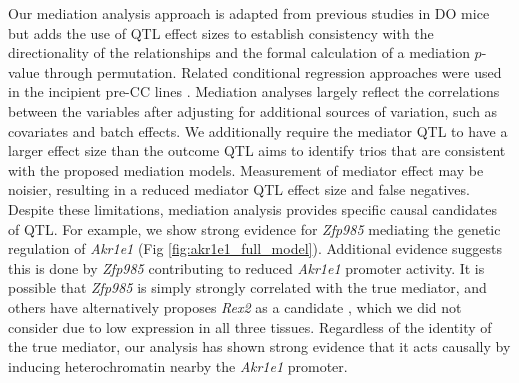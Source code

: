 \documentclass[10pt,letterpaper]{article}
\begin{document}
Our mediation analysis approach is adapted from previous studies in DO mice \cite{Chick2016,Keller2018,Skelly2019} but adds the use of QTL effect sizes to establish consistency with the directionality of the relationships and the formal calculation of a mediation $p$-value through permutation.  Related conditional regression approaches were used in the incipient pre-CC lines \cite{Rutledge2014, Kelada2014}.
Mediation analyses largely reflect the correlations between the variables after adjusting for additional sources of variation, such as covariates and batch effects. We additionally require the mediator QTL to have a larger effect size than the outcome QTL aims to identify trios that are consistent with the proposed mediation models. Measurement of mediator effect may be noisier, resulting in a reduced mediator QTL effect size and false negatives. 
Despite these limitations, mediation analysis provides specific causal candidates of QTL. For example, we show strong evidence for \textit{Zfp985} mediating the genetic regulation of \textit{Akr1e1} (Fig \ref{fig:akr1e1_full_model}). Additional evidence suggests this is done by \textit{Zfp985} contributing to reduced \textit{Akr1e1} promoter activity. It is possible that \textit{Zfp985} is simply strongly correlated with the true mediator, and others have alternatively proposes \textit{Rex2} as a candidate \cite{HamiltonWilliams2010}, which we did not consider due to low expression in all three tissues. Regardless of the identity of the true mediator, our analysis has shown strong evidence that it acts causally by inducing heterochromatin nearby the \textit{Akr1e1} promoter.
\end{document}
